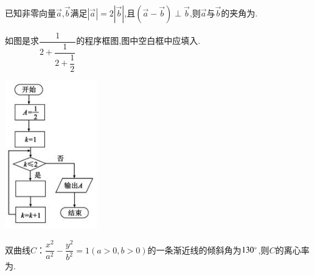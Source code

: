 \documentclass[a4paper]{BHCexam}
\begin{document}
\begin{groups}
\begin{questions}[]
\begin{minipage}{\textwidth}
\begin{solution}{4cm}
\end{solution}
\end{minipage}
\begin{minipage}{\textwidth}
\question[5]  已知非零向量$\overrightarrow{a}$,$\overrightarrow{b}$满足$|\overrightarrow{a}|=2|\overrightarrow{b}|$,且$(\overrightarrow{a}-\overrightarrow{b})\perp\overrightarrow{b}$,则$\overrightarrow{a}$与$\overrightarrow{b}$的夹角为.
\begin{solution}{4cm}

\end{solution}
\end{minipage}
\begin{minipage}{\textwidth}
\question[5] 如图是求$\dfrac{1}{2+\dfrac{1}{2+\dfrac{1}{2}}}$的程序框图,图中空白框中应填入.


\begin{center}
\includegraphics[width=4cm]{./lRyWbWTAbMoaIHdzGNbnHtHNwMC1OqLS.png}
\vspace{0.5cm}
\end{center}
\begin{solution}{4cm}

\end{solution}
\end{minipage}
\begin{minipage}{\textwidth}
\question[5] 双曲线$C$：$ \dfrac {x^{2}}{a^{2}} - \dfrac {y^{2}}{b^{2}} =1(a  \gt  0 , b  \gt  0)$的一条渐近线的倾斜角为$130^{\small \circ}$,则$C$的离心率为.
\begin{solution}{4cm}


\end{solution}
\end{minipage}
\end{questions}
\end{groups}
\end{document}
